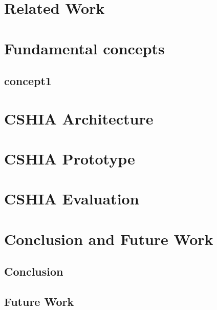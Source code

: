 \documentclass[Ingles,Final]{ic-tese-v3}
\begin{document}
\chapter{Related Work}
\label{chap:related_work}

\chapter{Fundamental concepts}
\label{chap:fundamental_concepts}  

\section{concept1}
\label{sec:concept1}

\chapter{CSHIA  Architecture}
\label{chap:cshia_architecture}

\chapter{CSHIA  Prototype}
\label{caho:cshia_prototype}


\chapter{CSHIA  Evaluation}
\label{chap:cshia:evaluation}

\chapter{Conclusion and Future Work}
\label{chap:conclusion}
    \section{Conclusion}
    \label{sec:conclusion}
\section{Future Work}
    \label{sec:future_work}





%
%     
\end{document}

